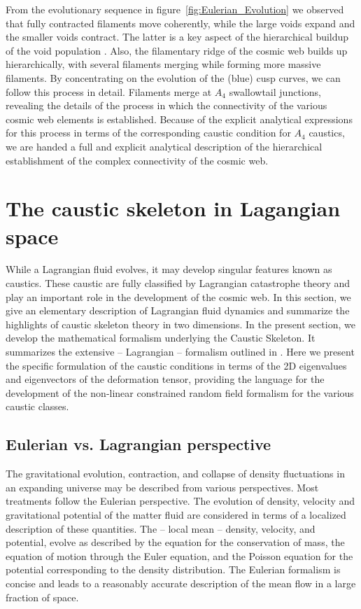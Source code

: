 \documentclass[a4paper, 11pt]{article}
\begin{document}
From the evolutionary sequence in figure~\ref{fig:Eulerian_Evolution} we observed that fully contracted filaments move coherently, while the large voids expand and the smaller voids contract. The latter is a key aspect of the hierarchical buildup of the void population \cite[see][]{Sheth:2004}. Also, the filamentary ridge of the cosmic web builds up hierarchically, with several filaments merging while forming more massive filaments. By concentrating on the evolution of the (blue) cusp curves, we can follow this process in detail. Filaments merge at $A_4$ swallowtail junctions, revealing the details of the process in which the connectivity of the various cosmic web elements is established. Because of the explicit analytical expressions for this process in terms of the corresponding caustic condition for $A_4$ caustics, we are handed a full and explicit analytical description of the hierarchical establishment of the complex connectivity of the cosmic web.

\section{The caustic skeleton in Lagangian space}\label{sec:Caustic_Skeleton_Theory}
While a Lagrangian fluid evolves, it may develop singular features known as caustics. These caustic are fully classified by Lagrangian catastrophe theory and play an important role in the development of the cosmic web. In this section, we give an elementary description of Lagrangian fluid dynamics and summarize the highlights of caustic skeleton theory in two dimensions. In the present section, we develop the mathematical formalism underlying the Caustic Skeleton. It summarizes the extensive -- Lagrangian -- formalism outlined in \cite{Feldbrugge:2018}. Here we present the specific formulation of the caustic conditions in terms of the 2D eigenvalues and eigenvectors of the deformation tensor, providing the language for the development of the non-linear constrained random field formalism for the various caustic classes.


\subsection{Eulerian vs. Lagrangian perspective}
The gravitational evolution, contraction, and collapse of density fluctuations in an expanding universe may be described from various perspectives. Most treatments follow the Eulerian perspective. The evolution of density, velocity and gravitational potential of the matter fluid are considered in terms of a localized description of these quantities. The -- local mean -- density, velocity, and potential, evolve as described by the equation for the conservation of mass, the equation of motion through the Euler equation, and the Poisson equation for the potential corresponding to the density distribution. The Eulerian formalism is concise and leads to a reasonably accurate description of the mean flow in a large fraction of space.
\end{document}
